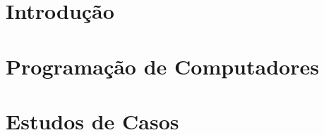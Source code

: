 \documentclass[relatorio]{tex/unemat-comp}
\begin{document}
\chapter*{Introdução}\label{chap:intro}


\chapter{Programação de Computadores}\label{chap:prog}


\chapter{Estudos de Casos}\label{chap:cases}






\cleardoublepage


\arial
\printbibliography[heading=bibintoc,title=\refname]


\end{document}
